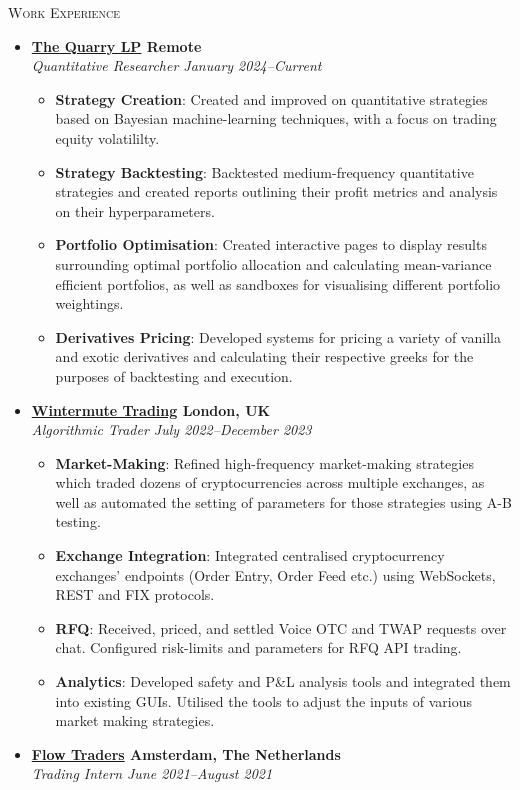 \documentclass[10pt]{article}
\begin{document}
	\textsc{\Large Work Experience}
	\begin{itemize}[left=0pt]
		\item \textbf{\href{https://www.quarrylp.com/}{The Quarry LP} \hfill Remote}\\
		\textit{Quantitative Researcher \hfill January 2024--Current}
		\begin{itemize}
			\item \textbf{Strategy Creation}: Created and improved on quantitative strategies based on Bayesian machine-learning techniques, with a focus on trading equity volatililty.
			\item \textbf{Strategy Backtesting}: Backtested medium-frequency quantitative strategies and created reports outlining their
			profit metrics and analysis on their hyperparameters.
			\item \textbf{Portfolio Optimisation}: Created interactive pages to display results surrounding optimal portfolio allocation and
			calculating mean-variance efficient portfolios, as well as sandboxes for visualising different portfolio weightings.
			\item \textbf{Derivatives Pricing}: Developed systems for pricing a variety of vanilla and exotic derivatives and calculating their respective greeks for the purposes of backtesting and execution.
		\end{itemize} 
		\item \textbf{\href{https://wintermute.com/}{Wintermute Trading} \hfill London, UK}\\
		\textit{Algorithmic Trader \hfill July 2022--December 2023}
		\begin{itemize}
			\item \textbf{Market-Making}: Refined high-frequency market-making strategies which traded dozens of cryptocurrencies across multiple exchanges, as well as automated the setting of parameters for those strategies using A-B testing.
			\item \textbf{Exchange Integration}: Integrated centralised cryptocurrency exchanges’ endpoints (Order Entry, Order Feed etc.) using WebSockets, REST and
			FIX protocols. 
			\item \textbf{RFQ}: Received, priced, and settled Voice OTC and TWAP requests over chat. Configured risk-limits and parameters for RFQ API trading.
			\item \textbf{Analytics}: Developed safety and P\&L analysis tools and integrated them into existing GUIs. Utilised the tools to
			adjust the inputs of various market making strategies.
		\end{itemize}
		\item \textbf{\href{https://www.flowtraders.com/}{Flow Traders} \hfill Amsterdam, The Netherlands}\\
		\textit{Trading Intern \hfill June 2021--August 2021}
	\end{itemize}
\end{document}
